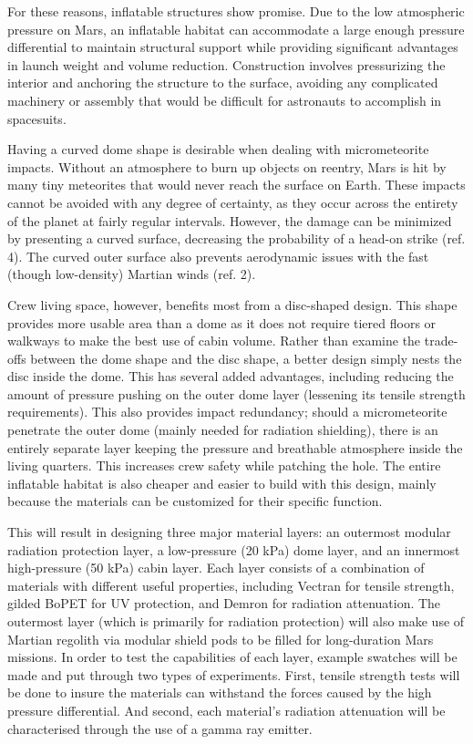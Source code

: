 \documentclass[12pt,letterpaper,oneside,twocolumn]{article}
\begin{document}
For these reasons, inflatable structures show promise. Due to the low atmospheric pressure on Mars, an inflatable habitat can accommodate a large enough pressure differential to maintain structural support while providing significant advantages in launch weight and volume reduction. Construction involves pressurizing the interior and anchoring the structure to the surface, avoiding any complicated machinery or assembly that would be difficult for astronauts to accomplish in spacesuits.

Having a curved dome shape is desirable when dealing with micrometeorite impacts. Without an atmosphere to burn up objects on reentry, Mars is hit by many tiny meteorites that would never reach the surface on Earth. These impacts cannot be avoided with any degree of certainty, as they occur across the entirety of the planet at fairly regular intervals. However, the damage can be minimized by presenting a curved surface, decreasing the probability of a head-on strike (ref. 4). The curved outer surface also prevents aerodynamic issues with the fast (though low-density) Martian winds (ref. 2).

Crew living space, however, benefits most from a disc-shaped design. This shape provides more usable area than a dome as it does not require tiered floors or walkways to make the best use of cabin volume. Rather than examine the trade-offs between the dome shape and the disc shape, a better design simply nests the disc inside the dome. This has several added advantages, including reducing the amount of pressure pushing on the outer dome layer (lessening its tensile strength requirements). This also provides impact redundancy; should a micrometeorite penetrate the outer dome (mainly needed for radiation shielding), there is an entirely separate layer keeping the pressure and breathable atmosphere inside the living quarters. This increases crew safety while patching the hole. The entire inflatable habitat is also cheaper and easier to build with this design, mainly because the materials can be customized for their specific function.

This will result in designing three major material layers: an outermost modular radiation protection layer, a low-pressure (20 kPa) dome layer, and an innermost high-pressure (50 kPa) cabin layer. Each layer consists of a combination of materials with different useful properties, including Vectran for tensile strength, gilded BoPET for UV protection, and Demron for radiation attenuation. The outermost layer (which is primarily for radiation protection) will also make use of Martian regolith via modular shield pods to be filled for long-duration Mars missions. In order to test the capabilities of each layer, example swatches will be made and put through two types of experiments. First, tensile strength tests will be done to insure the materials can withstand the forces caused by the high pressure differential. And second, each material’s radiation attenuation will be characterised through the use of a gamma ray emitter.
\end{document}
